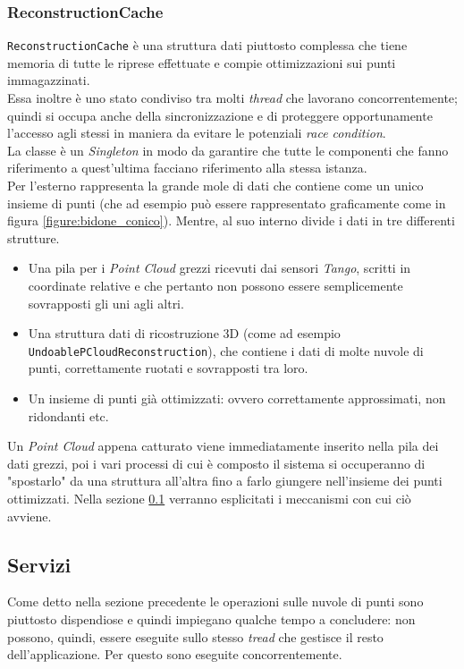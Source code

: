 \subsubsection{ReconstructionCache}
\texttt{ReconstructionCache} è una struttura dati piuttosto complessa che tiene memoria di tutte le riprese effettuate e compie ottimizzazioni sui punti immagazzinati.\\
Essa inoltre è uno stato condiviso tra molti \emph{thread} che lavorano concorrentemente; quindi si occupa anche della sincronizzazione e di proteggere opportunamente l'accesso agli stessi in maniera da evitare le potenziali \emph{race condition}.\\
La classe è un \emph{Singleton} in modo da garantire che tutte le componenti che fanno riferimento a quest'ultima facciano riferimento alla stessa istanza.\\
Per l'esterno rappresenta la grande mole di dati che contiene come un unico insieme di punti (che ad esempio può essere rappresentato graficamente come in figura \ref{figure:bidone_conico}). Mentre, al suo interno divide i dati in tre differenti strutture.
\begin{itemize}
	\item Una pila per i \emph{Point Cloud} grezzi ricevuti dai sensori \emph{Tango}, scritti in coordinate relative e che pertanto non possono essere semplicemente sovrapposti gli uni agli altri.
	\item Una struttura dati di ricostruzione 3D (come ad esempio \texttt{UndoablePCloudReconstruction}), che contiene i dati di molte nuvole di punti, correttamente ruotati e sovrapposti tra loro.
	\item Un insieme di punti già ottimizzati: ovvero correttamente approssimati, non ridondanti etc. 
\end{itemize}
Un \emph{Point Cloud} appena catturato viene immediatamente inserito nella pila dei dati grezzi, poi i vari processi di cui è composto il sistema si occuperanno di "spostarlo" da una struttura all'altra fino a farlo giungere nell'insieme dei punti ottimizzati. Nella sezione \ref{section:Servizi} verranno esplicitati i meccanismi con cui ciò avviene.

\subsection{Servizi}\label{section:Servizi}
Come detto nella sezione precedente le operazioni sulle nuvole di punti sono piuttosto dispendiose e quindi impiegano qualche tempo a concludere: non possono, quindi, essere eseguite sullo stesso \emph{tread} che gestisce il resto dell'applicazione. Per questo sono eseguite concorrentemente.
